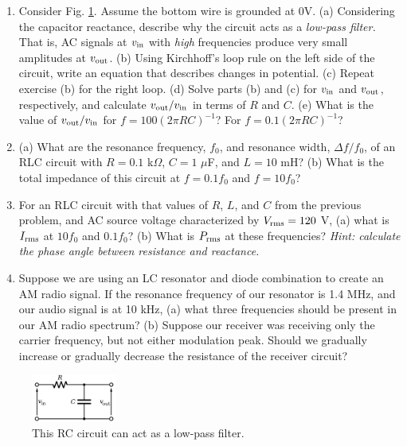 \documentclass[12pt,twocolumn]{article}
\begin{document}
\begin{enumerate}
\item Consider Fig. \ref{fig:RC}.  Assume the bottom wire is grounded at 0V.  (a) Considering the capacitor reactance, describe why the circuit acts as a \textit{low-pass filter.}  That is, AC signals at $v_{\rm in}$ with \textit{high} frequencies produce very small amplitudes at $v_{\rm out}$. (b) Using Kirchhoff's loop rule on the left side of the circuit, write an equation that describes changes in potential.  (c) Repeat exercise (b) for the right loop.  (d) Solve parts (b) and (c) for $v_{\rm in}$ and $v_{\rm out}$, respectively, and calculate $v_{\rm out}/v_{\rm in}$ in terms of $R$ and $C$.  (e) What is the value of $v_{\rm out}/v_{\rm in}$ for $f = 100(2\pi R C)^{-1}$? For $f = 0.1(2\pi R C)^{-1}$? \\ \vspace{6cm}
\item (a) What are the resonance frequency, $f_0$, and resonance width, $\Delta f/f_0$, of an RLC circuit with $R = 0.1$ k$\Omega$, $C = 1$ $\mu$F, and $L = 10$ mH? (b) What is the total impedance of this circuit at $f = 0.1f_0$ and $f = 10f_0$? \\ \vspace{1.5cm}
\item For an RLC circuit with that values of $R$, $L$, and $C$ from the previous problem, and AC source voltage characterized by $V_{\rm rms} = 120$ V, (a) what is $I_{\rm rms}$ at $10 f_0$ and $0.1 f_0$? (b) What is $P_{\rm rms}$ at these frequencies? \textit{Hint: calculate the phase angle between resistance and reactance.} \\ \vspace{4cm}
\item Suppose we are using an LC resonator and diode combination to create an AM radio signal.  If the resonance frequency of our resonator is 1.4 MHz, and our audio signal is at 10 kHz, (a) what three frequencies should be present in our AM radio spectrum?  (b) Suppose our receiver was receiving only the carrier frequency, but not either modulation peak.  Should we gradually increase or gradually decrease the resistance of the receiver circuit?  \\ \vspace{2cm}
\end{enumerate}

\begin{figure}[hb]
\centering
\includegraphics[width=0.25\textwidth]{low-pass.png}
\caption{\label{fig:RC} \small This RC circuit can act as a low-pass filter.}
\end{figure}
\end{document}
